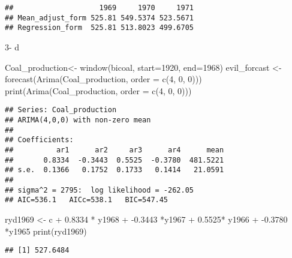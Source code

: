 \documentclass[
]{article}
\newenvironment{Shaded}{\begin{snugshade}}{\end{snugshade}}
\newcommand{\AttributeTok}[1]{\textcolor[rgb]{0.77,0.63,0.00}{#1}}
\newcommand{\DecValTok}[1]{\textcolor[rgb]{0.00,0.00,0.81}{#1}}
\newcommand{\FloatTok}[1]{\textcolor[rgb]{0.00,0.00,0.81}{#1}}
\newcommand{\FunctionTok}[1]{\textcolor[rgb]{0.00,0.00,0.00}{#1}}
\newcommand{\NormalTok}[1]{#1}
\newcommand{\OtherTok}[1]{\textcolor[rgb]{0.56,0.35,0.01}{#1}}
\newcommand{\SpecialCharTok}[1]{\textcolor[rgb]{0.00,0.00,0.00}{#1}}
\begin{document}
\begin{verbatim}
##                    1969     1970     1971
## Mean_adjust_form 525.81 549.5374 523.5671
## Regression_form  525.81 513.8023 499.6705
\end{verbatim}

3- d

\begin{Shaded}
\begin{Highlighting}[]
\NormalTok{Coal\_production}\OtherTok{\textless{}{-}} \FunctionTok{window}\NormalTok{(bicoal, }\AttributeTok{start=}\DecValTok{1920}\NormalTok{, }\AttributeTok{end=}\DecValTok{1968}\NormalTok{)}
\NormalTok{evil\_forcast }\OtherTok{\textless{}{-}} \FunctionTok{forecast}\NormalTok{(}\FunctionTok{Arima}\NormalTok{(Coal\_production, }\AttributeTok{order =} \FunctionTok{c}\NormalTok{(}\DecValTok{4}\NormalTok{, }\DecValTok{0}\NormalTok{, }\DecValTok{0}\NormalTok{)))}
\FunctionTok{print}\NormalTok{(}\FunctionTok{Arima}\NormalTok{(Coal\_production, }\AttributeTok{order =} \FunctionTok{c}\NormalTok{(}\DecValTok{4}\NormalTok{, }\DecValTok{0}\NormalTok{, }\DecValTok{0}\NormalTok{)))}
\end{Highlighting}
\end{Shaded}

\begin{verbatim}
## Series: Coal_production 
## ARIMA(4,0,0) with non-zero mean 
## 
## Coefficients:
##          ar1      ar2     ar3      ar4      mean
##       0.8334  -0.3443  0.5525  -0.3780  481.5221
## s.e.  0.1366   0.1752  0.1733   0.1414   21.0591
## 
## sigma^2 = 2795:  log likelihood = -262.05
## AIC=536.1   AICc=538.1   BIC=547.45
\end{verbatim}

\begin{Shaded}
\begin{Highlighting}[]
\NormalTok{ryd1969 }\OtherTok{\textless{}{-}}\NormalTok{ c }\SpecialCharTok{+} \FloatTok{0.8334} \SpecialCharTok{*}\NormalTok{ y1968 }\SpecialCharTok{+} \SpecialCharTok{{-}}\FloatTok{0.3443} \SpecialCharTok{*}\NormalTok{y1967 }\SpecialCharTok{+} \FloatTok{0.5525}\SpecialCharTok{*}\NormalTok{ y1966 }\SpecialCharTok{+} \SpecialCharTok{{-}}\FloatTok{0.3780} \SpecialCharTok{*}\NormalTok{y1965}
\FunctionTok{print}\NormalTok{(ryd1969)}
\end{Highlighting}
\end{Shaded}

\begin{verbatim}
## [1] 527.6484
\end{verbatim}
\end{document}
